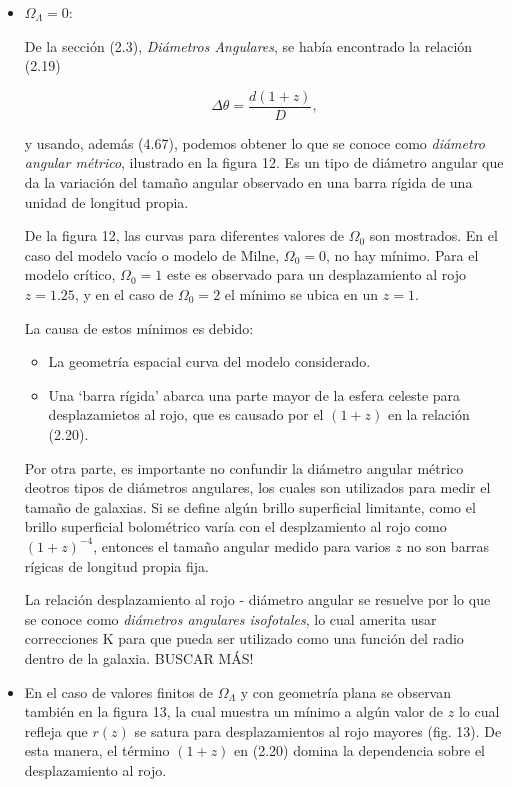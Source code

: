 \documentclass[11pt]{article}
\begin{document}
    \begin{itemize}
        \item $\Omega_{\Lambda} =0$:
        
        De la sección (2.3), {\textit{Diámetros Angulares}}, se había encontrado la relación (2.19)
        
        \begin{equation}
            \Delta \theta  = \frac{d(1+z)}{D},
        \end{equation}
        
        y usando, además (4.67), podemos obtener lo que se conoce como {\textit{diámetro angular métrico}}, ilustrado en la figura 12. Es un tipo de diámetro angular que da la variación del tamaño angular observado en una barra rígida de una unidad de longitud propia. 
        
        De la figura 12, las curvas para diferentes valores de $\Omega_0$ son mostrados. En el caso del modelo vacío o modelo de Milne, $\Omega_0=0$, no hay mínimo. Para el modelo crítico, $\Omega_0=1$ este es observado para un desplazamiento al rojo $z=1.25$, y en el caso de $\Omega_0=2$ el mínimo se ubica en un $z=1$.
        
        La causa de estos mínimos es debido: 

    \begin{itemize} 

	    \item La geometría espacial curva del modelo considerado.
	    \item Una `barra rígida’ abarca una parte mayor de la esfera celeste para desplazamietos al rojo, que es causado por el $(1+z)$ en la relación (2.20).

    \end{itemize}
        
        Por otra parte, es importante no confundir la diámetro angular métrico deotros tipos de diámetros angulares, los cuales son utilizados para medir el tamaño de galaxias. Si se define algún brillo superficial limitante, como el brillo superficial bolométrico varía con el desplzamiento al rojo como $(1+z)^{-4}$, entonces el tamaño angular medido para varios $z$ no son barras rígicas de longitud propia fija. 
        
        La relación desplazamiento al rojo -  diámetro angular se resuelve por lo que se conoce como {\textit{diámetros angulares isofotales}}, lo cual amerita usar correcciones K para que pueda ser utilizado como una función del radio dentro de la galaxia. BUSCAR MÁS!
        
        \item En el caso de valores finitos de $\Omega_{\Lambda}$ y con geometría plana se observan también en la figura 13, la cual muestra un mínimo a algún valor de $z$ lo cual refleja que $r(z)$ se satura para desplazamientos al rojo mayores (fig. 13). De esta manera, el término $(1+z)$ en (2.20) domina la dependencia sobre el desplazamiento al rojo. 
        
\end{itemize}
    
\end{document}
